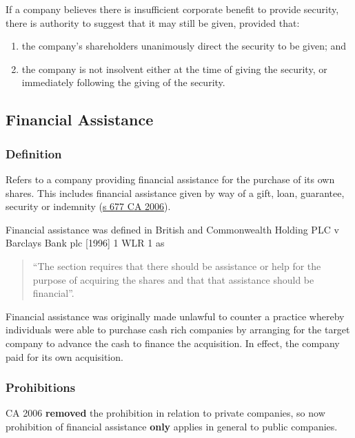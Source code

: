 \documentclass[
]{article}
\providecommand{\tightlist}{%
  \setlength{\itemsep}{0pt}\setlength{\parskip}{0pt}}
\begin{document}
If a company believes there is insufficient corporate benefit to provide
security, there is authority to suggest that it may still be given,
provided that:

\begin{enumerate}
\tightlist
\item
  the company's shareholders unanimously direct the security to be
  given; and
\item
  the company is not insolvent either at the time of giving the
  security, or immediately following the giving of the security.
\end{enumerate}

\hypertarget{financial-assistance}{%
\subsection{Financial Assistance}\label{financial-assistance}}

\hypertarget{definition}{%
\subsubsection{Definition}\label{definition}}

Refers to a company providing financial assistance for the purchase of
its own shares. This includes financial assistance given by way of a
gift, loan, guarantee, security or indemnity
(\href{https://www.legislation.gov.uk/ukpga/2006/46/section/677}{s 677
CA 2006}).

Financial assistance was defined in British and Commonwealth Holding PLC
v Barclays Bank plc {[}1996{]} 1 WLR 1 as

\begin{quote}
``The section requires that there should be assistance or help for the
purpose of acquiring the shares and that that assistance should be
financial''.
\end{quote}

Financial assistance was originally made unlawful to counter a practice
whereby individuals were able to purchase cash rich companies by
arranging for the target company to advance the cash to finance the
acquisition. In effect, the company paid for its own acquisition.

\hypertarget{prohibitions}{%
\subsubsection{Prohibitions}\label{prohibitions}}

CA 2006 \textbf{removed} the prohibition in relation to private
companies, so now prohibition of financial assistance \textbf{only}
applies in general to public companies.
\end{document}
